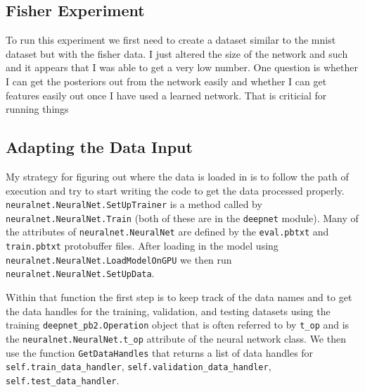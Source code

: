 \documentclass{article} %
\begin{document}
\subsection{Fisher Experiment}

To run this experiment we first need to create a dataset similar to the mnist dataset but with the fisher data.
I just altered the size of the network and such and it appears that I was able to get a very low number.
One question is whether I can get the posteriors out from the network easily and whether I can get features
easily out once I have used a learned network.  That is criticial for running things

\subsection{Adapting the Data Input}

My strategy for figuring out where the data is loaded in is to follow the path of execution
and try to start writing the code to get the data processed properly.  \texttt{neuralnet.NeuralNet.SetUpTrainer}
is a method called by \texttt{neuralnet.NeuralNet.Train} (both of these are in the \texttt{deepnet} module). Many of the
attributes of \texttt{neuralnet.NeuralNet} are defined by the \texttt{eval.pbtxt} and \texttt{train.pbtxt} 
protobuffer files.  After loading in the model using \texttt{neuralnet.NeuralNet.LoadModelOnGPU}
we then run \texttt{neuralnet.NeuralNet.SetUpData}.

Within that function the first step is to keep track of the data names and to get the data handles
for the training, validation, and testing datasets using the training \texttt{deepnet\_pb2.Operation} object
that is often referred to by \texttt{t\_op} and is the \texttt{neuralnet.NeuralNet.t\_op} attribute of the
neural network class.  We then use the function \texttt{GetDataHandles} that returns a list of 
data handles for \texttt{self.train\_data\_handler}, \texttt{self.validation\_data\_handler},
\texttt{self.test\_data\_handler}.
\end{document}
